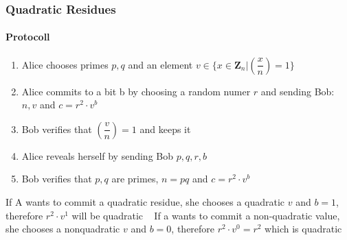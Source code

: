 \begin{frame}
	\frametitle{Quadratic Residues}
	\framesubtitle{Protocoll}
	\begin{enumerate}
		\item Alice chooses primes $p,q$ and an element $v \in \{ x \in \mathbf{Z}_n | (\dfrac{x}{n}) = 1\}$ 
		\item Alice commits to a bit b by choosing a random numer $r$ and sending Bob: $n,v$ and $c = r^2\cdot v^b$
		\item Bob verifies that $(\dfrac{v}{n})=1$ and keeps it
		\item Alice reveals herself by sending Bob $p,q,r,b$
		\item Bob verifies that $p,q$ are primes, $n=pq$ and $c=r^2\cdot v^b$ 
	\end{enumerate}

If A wants to commit a quadratic residue, she chooses a quadratic $v$ and $b=1$, therefore $r^2 \cdot v^1$ will be quadratic ~\newline
If a wants to commit a non-quadratic value, she chooses a nonquadratic $v$ and $b=0$, therefore $r^2 \cdot v^0 = r^2$ which is quadratic
\end{frame}